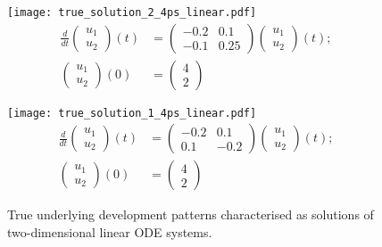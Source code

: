 \begin{figure}
	\centering
	\begin{minipage}{.5\linewidth}
		\centering
		\texttt{[image: true\_solution\_2\_4ps\_linear.pdf]}
		\scriptsize
		\begin{equation}\label{eq:ODE-systems-4pslinear-1}
		\begin{split}
		\frac{d}{dt}\begin{pmatrix} u_1 \\ u_2 \end{pmatrix}(t) &= \begin{pmatrix} -0.2 & 0.1 \\ -0.1 & 0.25 \end{pmatrix} \begin{pmatrix} u_1 \\ u_2 \end{pmatrix}(t); \\
		\begin{pmatrix} u_1 \\ u_2 \end{pmatrix}(0) &= \begin{pmatrix} 4 \\ 2 \end{pmatrix}
		\end{split}
		\end{equation}
		\normalsize
	\end{minipage}\begin{minipage}{.5\linewidth}
		\centering
		\texttt{[image: true\_solution\_1\_4ps\_linear.pdf]}
		\scriptsize		
		\begin{equation}\label{eq:ODE-systems-4pslinear-2}
		\begin{split}
		\frac{d}{dt}\begin{pmatrix} u_1 \\ u_2 \end{pmatrix}(t) &= \begin{pmatrix} -0.2 & 0.1 \\ 0.1 & -0.2 \end{pmatrix} \begin{pmatrix} u_1 \\ u_2 \end{pmatrix}(t); \\
		\begin{pmatrix} u_1 \\ u_2 \end{pmatrix}(0) &= \begin{pmatrix} 4 \\ 2 \end{pmatrix}
		\end{split}
		\end{equation}
		\normalsize
	\end{minipage}
	\caption{True underlying development patterns characterised as solutions of two-dimensional linear ODE systems.}
	\label{fig:apps-true_solution_linear_4ps}
\end{figure}

